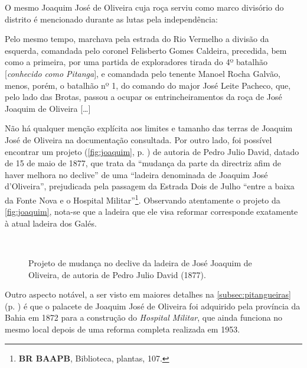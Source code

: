 O mesmo Joaquim José de Oliveira cuja roça serviu como marco divisório do distrito é mencionado durante as lutas pela independência:

\begin{citacao}
Pelo mesmo tempo, marchava pela estrada do Rio Vermelho a divisão da esquerda, comandada pelo coronel Felisberto Gomes Caldeira, precedida, bem como a primeira, por uma partida de exploradores tirada do 4º batalhão [\textit{conhecido como Pitanga}], e comandada pelo tenente Manoel Rocha Galvão, menos, porém, o batalhão nº 1, do comando do major José Leite Pacheco, que, pelo lado das Brotas, passou a ocupar os entrincheiramentos da roça de José Joaquim de Oliveira [\dots] \cite[p.~58]{vieira_memorias_1903}
\end{citacao}

Não há qualquer menção explícita aos limites e tamanho das terras de Joaquim José de Oliveira na documentação consultada. Por outro lado, foi possível encontrar um projeto (\autoref{fig:joaquim}, p. \pageref{fig:joaquim}) de autoria de Pedro Julio David, datado de 15 de maio de 1877, que trata da ``mudança da parte da directriz afim de haver melhora no declive'' de uma ``ladeira denominada de Joaquim José d'Oliveira'', prejudicada pela passagem da Estrada Dois de Julho ``entre a baixa da Fonte Nova e o Hospital Militar''\footnote{\textbf{BR BAAPB}, Biblioteca, plantas, 107.}. Observando atentamente o projeto da \autoref{fig:joaquim}, nota-se que a ladeira que ele visa reformar corresponde exatamente à atual ladeira dos Galés.

\begin{figure}[!htp]
\centering
{}
\  %
\  %
\caption{Projeto de mudança no declive da ladeira de José Joaquim de Oliveira, de autoria de Pedro Julio David (1877).}
\label{fig:joaquim}
\end{figure}

Outro aspecto notável, a ser visto em maiores detalhes na \autoref{subsec:pitangueiras} (p. \pageref{subsec:pitangueiras}) é que o palacete de Joaquim José de Oliveira foi adquirido pela província da Bahia em 1872 para a construção do \textit{Hospital Militar}, que ainda funciona no mesmo local depois de uma reforma completa realizada em 1953.


